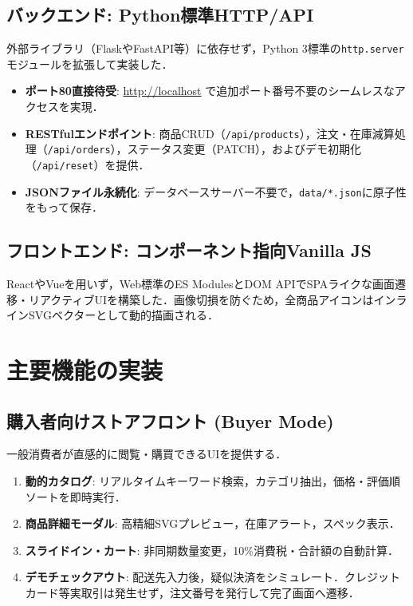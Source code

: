 \documentclass[a4paper,twocolumn,9pt]{bxjsarticle}
\begin{document}
\subsection{バックエンド: Python標準HTTP/API}
外部ライブラリ（FlaskやFastAPI等）に依存せず，Python 3標準の\texttt{http.server}モジュールを拡張して実装した．
\begin{itemize}
  \item \textbf{ポート80直接待受}: \url{http://localhost} で追加ポート番号不要のシームレスなアクセスを実現．
  \item \textbf{RESTfulエンドポイント}: 商品CRUD（\texttt{/api/products}），注文・在庫減算処理（\texttt{/api/orders}），ステータス変更（PATCH），およびデモ初期化（\texttt{/api/reset}）を提供．
  \item \textbf{JSONファイル永続化}: データベースサーバー不要で，\texttt{data/*.json}に原子性をもって保存．
\end{itemize}

\subsection{フロントエンド: コンポーネント指向Vanilla JS}
ReactやVueを用いず，Web標準のES ModulesとDOM APIでSPAライクな画面遷移・リアクティブUIを構築した．画像切損を防ぐため，全商品アイコンはインラインSVGベクターとして動的描画される．

\section{主要機能の実装}

\subsection{購入者向けストアフロント (Buyer Mode)}
一般消費者が直感的に閲覧・購買できるUIを提供する．
\begin{enumerate}
  \item \textbf{動的カタログ}: リアルタイムキーワード検索，カテゴリ抽出，価格・評価順ソートを即時実行．
  \item \textbf{商品詳細モーダル}: 高精細SVGプレビュー，在庫アラート，スペック表示．
  \item \textbf{スライドイン・カート}: 非同期数量変更，10\%消費税・合計額の自動計算．
  \item \textbf{デモチェックアウト}: 配送先入力後，疑似決済をシミュレート．クレジットカード等実取引は発生せず，注文番号を発行して完了画面へ遷移．
\end{enumerate}
\end{document}

